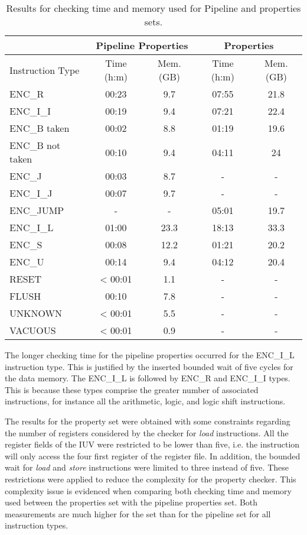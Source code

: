 \begin{table*}[htb!] 
	\centering 
	\caption{Results for checking time and memory used for Pipeline and \SSQED{} properties sets.} 
	\label{tab:pipe-s2qed-check-resutls}
	\begin{tabular}{lcccc}
          & \multicolumn{2}{c}{\textbf{Pipeline Properties}} & \multicolumn{2}{c}{\textbf{\SSQED{} Properties}} \\
          \hline
         Instruction Type & Time (h:m) & Mem.(GB) & Time (h:m) & Mem.(GB)  \\
          \hline
        ENC\_R & 00:23 & 9.7 & 07:55 &  21.8  \\
        ENC\_I\_I & 00:19 & 9.4 & 07:21 &  22.4\\
        ENC\_B taken  & 00:02 & 8.8 & 01:19 & 19.6\\
        ENC\_B not taken & 00:10 & 9.4 & 04:11 &  24  \\
        ENC\_J & 00:03 & 8.7 & - &  -  \\
        ENC\_I\_J & 00:07 & 9.7 & - &  -  \\
        ENC\_JUMP & - & - & 05:01 &  19.7  \\
        ENC\_I\_L & 01:00 & 23.3 & 18:13 & 33.3  \\
        ENC\_S & 00:08 & 12.2 & 01:21 &  20.2  \\
        ENC\_U & 00:14 & 9.4 & 04:12 & 20.4  \\
        RESET & < 00:01 & 1.1 & - &  -  \\
        FLUSH & 00:10 & 7.8 & - &  -  \\
        UNKNOWN & < 00:01 & 5.5 & - &  -  \\
        VACUOUS & < 00:01 & 0.9 & - &  -  \\
\end{tabular}
\end{table*}

The longer checking time for the pipeline properties occurred for the ENC\_I\_L instruction type. This is justified by the inserted bounded wait of five cycles for the data memory. The ENC\_I\_L is followed by ENC\_R and ENC\_I\_I types. This is because these types comprise the greater number of associated instructions, for instance all the arithmetic, logic, and logic shift instructions.

The results for the \SSQED{} property set were obtained with some constraints regarding the number of registers considered by the checker for \textit{load} instructions. All the register fields of the IUV were restricted to be lower than five, i.e. the instruction will only access the four first register of the register file. In addition, the bounded wait for \textit{load} and \textit{store} instructions were limited to three instead of five. These restrictions were applied to reduce the complexity for the property checker. This complexity issue is evidenced when comparing both checking time and memory used between the \SSQED{} properties set with the pipeline properties set. Both measurements are much higher for the \SSQED{} set than for the pipeline set for all instruction types.

